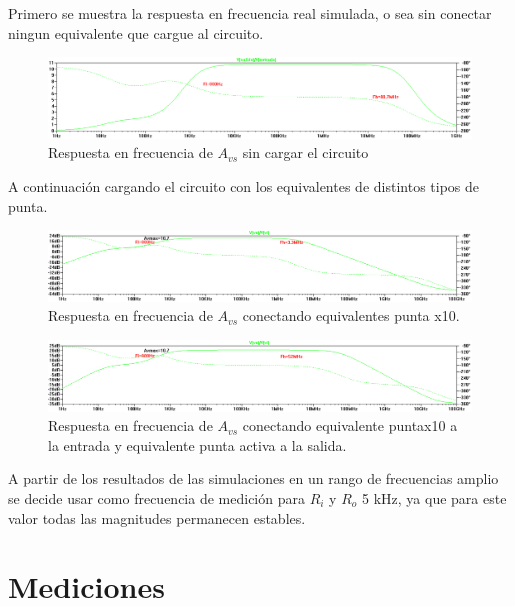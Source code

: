 \documentclass[10pt,spanish,a4paper,notitlepage]{article}
\begin{document}
Primero se muestra la respuesta en frecuencia real simulada, o sea sin conectar ningun equivalente que cargue al circuito.

\begin{figure}[H]
\centering
\includegraphics[scale=0.45]{senales/Avs_rta_frec_sin_punta.png}
\caption{Respuesta en frecuencia de $A_{vs}$ sin cargar el circuito}
\label{fig:SIMUAvs_rta_frec}
\end{figure}

A continuación cargando el circuito con los equivalentes de distintos tipos de punta. 



\begin{figure}[H]
\centering
\includegraphics[scale=0.45]{senales/Avs_rta_frec_con_puntax10.png}
\caption{Respuesta en frecuencia de $A_{vs}$ conectando equivalentes punta x10.}
\label{fig:SIMUAvs_rta_frec_con_puntax10}
\end{figure}

\begin{figure}[H]
\centering
\includegraphics[scale=0.45]{senales/Avs_rta_frec_con_punta_activa.png}
\caption{Respuesta en frecuencia de $A_{vs}$ conectando equivalente puntax10 a la entrada y equivalente punta activa a la salida.}
\label{fig:SIMUAvs_rta_frec_con_punta_activa}
\end{figure}

A partir de los resultados de las simulaciones en un rango de frecuencias amplio se decide usar como frecuencia de medición para $R_i$ y $R_o$ 5 \unit{kHz}, ya que para este valor todas las magnitudes permanecen estables.


\section{Mediciones}
\end{document}
